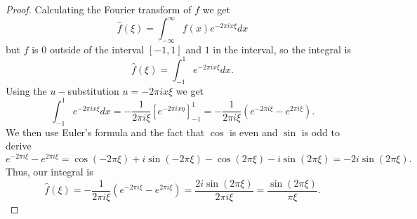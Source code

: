 \documentclass{article}
\begin{document}
\begin{proof}
    Calculating the Fourier transform of $f$ we get 
    \[
    \hat{f}(\xi) = \int_{-\infty}^{\infty} f(x) e^{-2 \pi i x \xi} dx    
    \]
    but $f$ is $0$ outside of the interval $[-1, 1]$ and $1$ in the interval, so the integral is 
    \[
    \hat{f}(\xi) = \int_{-1}^{1} e^{-2 \pi i x \xi} dx. 
    \]
    Using the $u-$substitution $u = -2 \pi i x \xi$ we get 
    \[
        \int_{-1}^{1} e^{-2 \pi i x \xi} dx = -\frac{1}{2 \pi i \xi}\left[e^{-2 \pi i x \eta} \right]_{-1}^1 = -\frac{1}{2 \pi i \xi}\left(e^{-2 \pi i \xi} - e^{2 \pi i \xi} \right).
    \]
    We then use Euler's formula and the fact that $\cos$ is even and $\sin$ is odd to derive
    \[e^{-2 \pi i \xi} - e^{2 \pi i \xi} = \cos(- 2 \pi \xi) + i \sin(-2 \pi \xi) - \cos(2 \pi \xi) - i \sin(2 \pi \xi) = -2i \sin( 2\pi \xi).\]
    Thus, our integral is 
    \[
    \hat{f}(\xi) = -\frac{1}{2 \pi i \xi}\left(e^{-2 \pi i \xi} - e^{2 \pi i \xi} \right) = \frac{2 i \sin(2 \pi \xi)}{2 \pi i \xi} = \frac{\sin(2 \pi \xi)}{\pi \xi}. 
    \] 


\end{proof}
\end{document}
